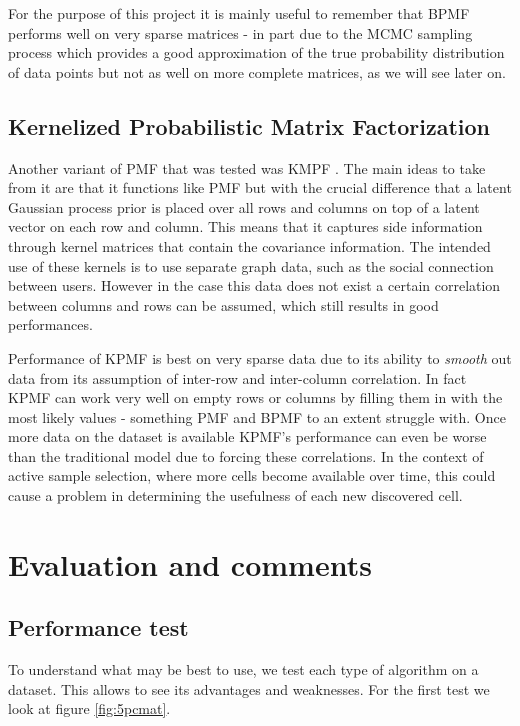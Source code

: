 For the purpose of this project it is mainly useful to remember that BPMF performs well on very sparse matrices - in  part due to the MCMC sampling process which provides a good approximation of the true probability distribution of data points but not as well on more complete matrices, as we will see later on.

\subsection{Kernelized Probabilistic Matrix Factorization}
Another variant of PMF that was tested was KMPF \cite{kpmf}. The main ideas to take from it are that it functions like PMF but with the crucial difference that a latent Gaussian process prior is placed over all rows and columns on top of a latent vector on each row and column. This means that it captures side information through kernel matrices that contain the covariance information. The intended use of these kernels is to use separate graph data, such as the social connection between users. However in the case this data does not exist a certain correlation between columns and rows can be assumed, which still results in good performances.

Performance of KPMF is best on very sparse data due to its ability to \textit{smooth} out data from its assumption of inter-row and inter-column correlation. In fact KPMF can work very well on empty rows or columns by filling them in with the most likely values - something PMF and BPMF to an extent struggle with.  Once more data on the dataset is available KPMF's performance can even be worse than the traditional model due to forcing these correlations. In the context of active sample selection, where more cells become available over time, this could cause a problem in determining the usefulness of each new discovered cell.
\section{Evaluation and comments}
\subsection{Performance test}

To understand what may be best to use, we test each type of algorithm on a dataset. This allows to see its advantages and weaknesses. For the first test we look at figure \ref{fig:5pcmat}.

